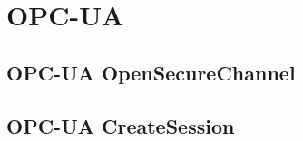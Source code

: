 \documentclass[a4paper, twocolumn]{article}
\newcommand{\opcua}{OPC-UA\xspace}
\begin{document}
\section{\opcua}\label{sec:opcua}
\subsection{\opcua OpenSecureChannel}


\subsection{\opcua CreateSession}


%
%



\end{document}
